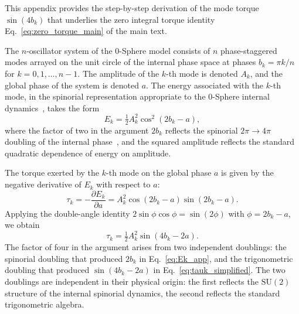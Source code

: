 \documentclass[%
 reprint, amsmath,amssymb, aps, prb, ]{revtex4-2}
\numberwithin{equation}{section}
\begin{document}
This appendix provides the step-by-step derivation of the mode torque $\sin(4 b_k)$ that underlies the zero integral torque identity Eq.~\eqref{eq:zero_torque_main} of the main text.

The $n$-oscillator system of the 0-Sphere model consists of $n$ phase-staggered modes arrayed on the unit circle of the internal phase space at phases $b_k = \pi k/n$ for $k = 0, 1, \ldots, n-1$. The amplitude of the $k$-th mode is denoted $A_k$, and the global phase of the system is denoted $a$. The energy associated with the $k$-th mode, in the spinorial representation appropriate to the 0-Sphere internal dynamics~\cite{hanamura26, hanamura48}, takes the form
\begin{equation}
E_k = \tfrac{1}{2} A_k^2 \cos^2(2 b_k - a),
\label{eq:Ek_app}
\end{equation}
where the factor of two in the argument $2 b_k$ reflects the spinorial $2\pi \to 4\pi$ doubling of the internal phase~\cite{hanamura26, hanamura50}, and the squared amplitude reflects the standard quadratic dependence of energy on amplitude.

The torque exerted by the $k$-th mode on the global phase $a$ is given by the negative derivative of $E_k$ with respect to $a$:
\begin{equation}
\tau_k = -\frac{\partial E_k}{\partial a} = A_k^2 \cos(2 b_k - a) \sin(2 b_k - a).
\label{eq:tauk_app}
\end{equation}
Applying the double-angle identity $2 \sin\phi \cos\phi = \sin(2\phi)$ with $\phi = 2 b_k - a$, we obtain
\begin{equation}
\tau_k = \tfrac{1}{2} A_k^2 \sin(4 b_k - 2 a).
\label{eq:tauk_simplified}
\end{equation}
The factor of four in the argument arises from two independent doublings: the spinorial doubling that produced $2 b_k$ in Eq.~\eqref{eq:Ek_app}, and the trigonometric doubling that produced $\sin(4 b_k - 2 a)$ in Eq.~\eqref{eq:tauk_simplified}. The two doublings are independent in their physical origin: the first reflects the $\mathrm{SU}(2)$ structure of the internal spinorial dynamics, the second reflects the standard trigonometric algebra.
\end{document}
